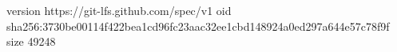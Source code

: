 version https://git-lfs.github.com/spec/v1
oid sha256:3730be00114f422bea1cd96fc23aac32ee1cbd148924a0ed297a644e57c78f9f
size 49248
